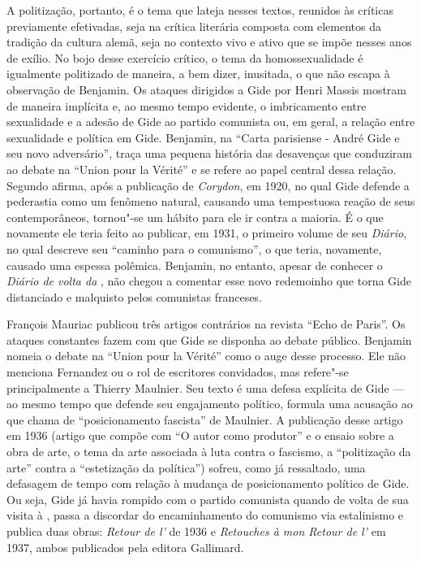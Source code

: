 A politização, portanto, é o tema que lateja nesses textos, reunidos às
críticas previamente efetivadas, seja na crítica literária composta com
elementos da tradição da cultura alemã, seja no contexto vivo e ativo
que se impõe nesses anos de exílio. No bojo desse exercício crítico, o
tema da homossexualidade é igualmente politizado de maneira, a bem
dizer, inusitada, o que não escapa à observação de Benjamin. Os ataques
dirigidos a Gide por Henri Massis mostram de maneira implícita e, ao
mesmo tempo evidente, o imbricamento entre sexualidade e a adesão de
Gide ao partido comunista ou, em geral, a relação entre sexualidade e
política em Gide. Benjamin, na ``Carta parisiense  - André Gide e seu
novo adversário'', traça uma pequena história das desavenças que
conduziram ao debate na ``Union pour la Vérité'' e se refere ao papel
central dessa relação. Segundo afirma, após a publicação de
\emph{Corydon}, em 1920, no qual Gide defende a pederastia como um
fenômeno natural, causando uma tempestuosa reação de seus
contemporâneos, tornou"-se um hábito para ele ir contra a maioria. É o
que novamente ele teria feito ao publicar, em 1931, o primeiro volume de
seu \emph{Diário}, no qual descreve seu ``caminho para o comunismo'', o
que teria, novamente, causado uma espessa polêmica. Benjamin, no
entanto, apesar de conhecer o \emph{Diário de volta da }, não
chegou a comentar esse novo redemoinho que torna Gide distanciado e
malquisto pelos comunistas franceses.

François Mauriac publicou três artigos contrários na revista ``Echo de
Paris''. Os ataques constantes fazem com que Gide se disponha ao debate
público. Benjamin nomeia o debate na ``Union pour la Vérité'' como o
auge desse processo. Ele não menciona Fernandez ou o rol de escritores
convidados, mas refere"-se principalmente a Thierry Maulnier. Seu texto é
uma defesa explícita de Gide --- ao mesmo tempo que defende seu
engajamento político, formula uma acusação ao que chama de
``posicionamento fascista'' de Maulnier. A publicação desse artigo em
1936 (artigo que compõe com ``O autor como produtor'' e o ensaio sobre a
obra de arte, o tema da arte associada à luta contra o fascismo, a
``politização da arte'' contra a ``estetização da política'') sofreu,
como já ressaltado, uma defasagem de tempo com relação à mudança de
posicionamento político de Gide. Ou seja, Gide já havia rompido com o
partido comunista quando de volta de sua visita à , passa a
discordar do encaminhamento do comunismo via estalinismo e publica duas
obras: \emph{Retour de l'} de 1936 e \emph{Retouches à mon
Retour de l'} em 1937, ambos publicados pela editora Gallimard.

